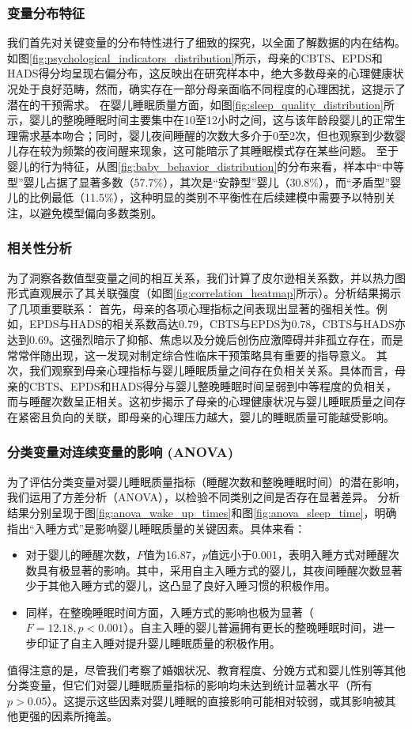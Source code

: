 \documentclass[withoutpreface,bwprint]{cumcmthesis}
\begin{document}
\subsubsection{变量分布特征}
我们首先对关键变量的分布特性进行了细致的探究，以全面了解数据的内在结构。
如图\ref{fig:psychological_indicators_distribution}所示，母亲的CBTS、EPDS和HADS得分均呈现右偏分布，这反映出在研究样本中，绝大多数母亲的心理健康状况处于良好范畴，然而，确实存在一部分母亲面临不同程度的心理困扰，这提示了潜在的干预需求。
在婴儿睡眠质量方面，如图\ref{fig:sleep_quality_distribution}所示，婴儿的整晚睡眠时间主要集中在10至12小时之间，这与该年龄段婴儿的正常生理需求基本吻合；同时，婴儿夜间睡醒的次数大多介于0至2次，但也观察到少数婴儿存在较为频繁的夜间醒来现象，这可能暗示了其睡眠模式存在某些问题。
至于婴儿的行为特征，从图\ref{fig:baby_behavior_distribution}的分布来看，样本中“中等型”婴儿占据了显著多数（57.7\%），其次是“安静型”婴儿（30.8\%），而“矛盾型”婴儿的比例最低（11.5\%），这种明显的类别不平衡性在后续建模中需要予以特别关注，以避免模型偏向多数类别。

\subsubsection{相关性分析}
为了洞察各数值型变量之间的相互关系，我们计算了皮尔逊相关系数，并以热力图形式直观展示了其关联强度（如图\ref{fig:correlation_heatmap}所示）。分析结果揭示了几项重要联系：
首先，母亲的各项心理指标之间表现出显著的强相关性。例如，EPDS与HADS的相关系数高达0.79，CBTS与EPDS为0.78，CBTS与HADS亦达到0.69。这强烈暗示了抑郁、焦虑以及分娩后创伤应激障碍并非孤立存在，而是常常伴随出现，这一发现对制定综合性临床干预策略具有重要的指导意义。
其次，我们观察到母亲心理指标与婴儿睡眠质量之间存在负相关关系。具体而言，母亲的CBTS、EPDS和HADS得分与婴儿整晚睡眠时间呈弱到中等程度的负相关，而与睡醒次数呈正相关。这初步揭示了母亲的心理健康状况与婴儿睡眠质量之间存在紧密且负向的关联，即母亲的心理压力越大，婴儿的睡眠质量可能越受影响。

\subsubsection{分类变量对连续变量的影响 (ANOVA)}
为了评估分类变量对婴儿睡眠质量指标（睡醒次数和整晚睡眠时间）的潜在影响，我们运用了方差分析（ANOVA），以检验不同类别之间是否存在显著差异。
分析结果分别呈现于图\ref{fig:anova_wake_up_times}和图\ref{fig:anova_sleep_time}，明确指出“入睡方式”是影响婴儿睡眠质量的关键因素。具体来看：
\begin{itemize}
    \item 对于婴儿的睡醒次数，$F$值为16.87，$p$值远小于0.001，表明入睡方式对睡醒次数具有极显著的影响。其中，采用自主入睡方式的婴儿，其夜间睡醒次数显著少于其他入睡方式的婴儿，这凸显了良好入睡习惯的积极作用。
    \item 同样，在整晚睡眠时间方面，入睡方式的影响也极为显著（$F=12.18, p<0.001$）。自主入睡的婴儿普遍拥有更长的整晚睡眠时间，进一步印证了自主入睡对提升婴儿睡眠质量的积极作用。
\end{itemize}
值得注意的是，尽管我们考察了婚姻状况、教育程度、分娩方式和婴儿性别等其他分类变量，但它们对婴儿睡眠质量指标的影响均未达到统计显著水平（所有$p>0.05$）。这提示这些因素对婴儿睡眠的直接影响可能相对较弱，或其影响被其他更强的因素所掩盖。
\end{document}
